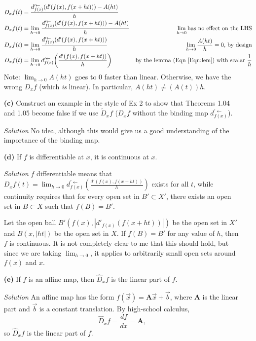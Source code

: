 \documentclass[11pt]{article}
\begin{document}
\begin{itemize}
\begin{align*}
    D_xf(t)  &= \frac{d^{\prime\leftarrow}_{f(x)}(d'(f(x),f(x+ht))) - A(ht)}{h} &               &\\
    D_xf(t)  &= \lim_{h \to 0}\frac{d^{\prime\leftarrow}_{f(x)}(d'(f(x),f(x+ht))) - A(ht)}{h} &
     \lim_{h\to0} \text{has no effect on the LHS} &\\
    D_xf(t)  &= \lim_{h \to 0}\frac{d^{\prime\leftarrow}_{f(x)}(d'(f(x),f(x+ht)))}{h} &
     \lim_{h\to0}\frac{A(ht)}{h} = 0 \text{, by design} &\\
    D_xf(t)  &= \lim_{h \to 0}d^{\prime\leftarrow}_{f(x)}\bigg(\frac{d'(f(x),f(x+ht))}{h}\bigg) &
     \text{by the lemma (Eqn~\ref{Eqn:lem}) with scalar } \frac{1}{h} &\\
  \end{align*}
  Note: $\lim_{h\to0}A(ht)$ goes to 0 faster than linear.  Otherwise, we have the wrong $D_xf$
  (which \emph{is} linear).  In particular, $A(ht) \ne (A(t))h$.
  
\item[\textbf{(c)}] Construct an example in the style of Ex 2 to show that Theorems 1.04 and 1.05 become
  false if we use $\tilde{D}_xf$ ($D_xf$ without the binding map $d^{\prime\leftarrow}_{f(x)}$).
\item[\emph{Solution}] No idea, although this would give us a good understanding
  of the importance of the binding map.
  
\item[\textbf{(d)}] If $f$ is differentiable at $x$, it is continuous at $x$.
\item[\emph{Solution}] $f$ differentiable means that $D_xf(t) = \lim_{h \to 0}
  d^{\prime\leftarrow}_{f(x)}(\frac{d'(f(x),f(x+ht))}{h})$ exists for all $t$, while continuity requires
  that for every open set in $B' \subset X'$, there exists an open set in $B \subset X$ such that $f(B) =
  B'$.

  Let the open ball $B'(f(x), |d'_{f(x)}(f(x + ht))|)$ be the open set in $X'$ and $B(x, |ht|)$ be the
  open set in $X$.  If $f(B) = B'$ for any value of $h$, then $f$ is continuous.  It is not completely
  clear to me that this should hold, but since we are taking $\lim_{h\to0}$, it applies to arbitrarily
  small open sets around $f(x)$ and $x$.

\item[\textbf{(e)}] If $f$ is an affine map, then $\hat{D}_xf$ is the linear part of $f$.
\item[\emph{Solution}] An affine map has the form $f(\vec{x}) = \mathbf{A}\vec{x} + \vec{b}$, where
  $\mathbf{A}$ is the linear part and $\vec{b}$ is a constant translation.  By high-school calculus,
  \begin{equation}
    \hat{D}_xf = \frac{df}{dx} = \mathbf{A},
  \end{equation}
  so $\hat{D}_xf$ is the linear part of $f$.
\end{itemize}
\end{document}
